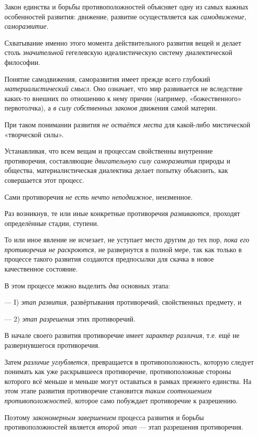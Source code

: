 \documentclass[a4paper,14pt,russian]{extreport}
\begin{document}
Закон единства и борьбы противоположностей объясняет одну из самых важных особенностей развития: движение, развитие осуществляется как \emph{самодвижение, саморазвитие}.

Схватывание именно этого момента действительного развития вещей и делает столь \emph{значительной} гегелевскую идеалистическую систему диалектической философии.

Понятие самодвижения, саморазвития имеет прежде всего глубокий \emph{материалистический смысл}. Оно означает, что мир развивается не вследствие каких-то внешних по отношению к нему причин (например, «божественного» первотолчка), а \emph{в силу собственных законов} движения самой материи.

При таком понимании развития \emph{не остаётся места} для какой-либо мистической «творческой силы».

Устанавливая, что всем вещам и процессам свойственны внутренние противоречия, составляющие \emph{двигательную силу саморазвития} природы и общества, материалистическая диалектика делает попытку объяснить, как совершается этот процесс.

Сами противоречия \emph{не есть нечто неподвижное}, неизменное.

Раз возникнув, те или иные конкретные противоречия \emph{развиваются}, проходят определённые стадии, ступени.

То или иное явление не исчезает, не уступает место другим до тех пор, \emph{пока его противоречия не раскроются}, не развернутся в полной мере, так как только в процессе такого развития создаются предпосылки для скачка в новое качественное состояние.

В этом процессе можно выделить \emph{два} основных этапа:

--- I) \emph{этап развития}, развёртывания противоречий, свойственных предмету, и

--- 2) \emph{этап разрешения} этих противоречий.

В начале своего развития противоречие имеет \emph{характер различия}, т.е. ещё не развернувшегося противоречия.

Затем \emph{различие углубляется}, превращается в противоположность, которую следует понимать как уже раскрывшееся противоречие, противоположные стороны которого всё меньше и меньше могут оставаться в рамках прежнего единства. На этом этапе развития противоречие становится \emph{таким соотношением противоположностей}, которое само побуждает противоречие к разрешению.

Поэтому \emph{закономерным завершением} процесса развития и борьбы противоположностей является \emph{второй этап} --- этап разрешения противоречия.
\end{document}
